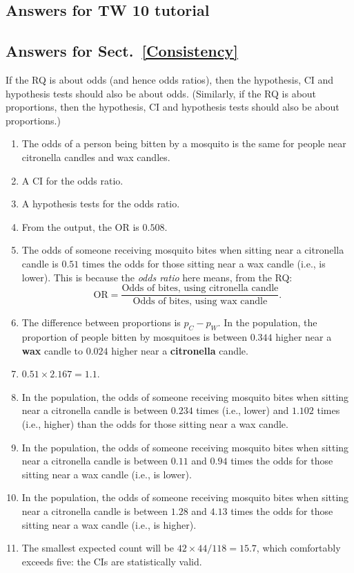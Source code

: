 \documentclass[
  11pt,
  a4paper,
  krantz2]{krantz}
\providecommand{\tightlist}{%
  \setlength{\itemsep}{0pt}\setlength{\parskip}{0pt}}
\begin{document}
\begin{footnotesize}
\section{Answers for TW 10 tutorial}\label{Lecture10Answers}

\subsection*{Answers for Sect.~\ref{Consistency}}\label{answers-for-sect.-refconsistency}

If the RQ is about odds (and hence odds ratios), then the hypothesis, CI and hypothesis tests should also be about odds.
(Similarly, if the RQ is about proportions, then the hypothesis, CI and hypothesis tests should also be about proportions.)

\begin{enumerate}
\def\labelenumi{\arabic{enumi}.}
\tightlist
\item
  The odds of a person being bitten by a mosquito is the same for people near citronella candles and wax candles.
\item
  A CI for the odds ratio.
\item
  A hypothesis tests for the odds ratio.
\item
  From the output, the OR is \(0.508\).
\item
  The odds of someone receiving mosquito bites when sitting near a citronella candle is \(0.51\) times the odds for those sitting near a wax candle (i.e., is lower).
  This is because the \emph{odds ratio} here means, from the RQ:
  \[
    \text{OR} = \frac{\text{Odds of bites, using citronella candle}}{\text{Odds of bites, using wax candle}}.
  \]
\item
  The difference between proportions is \(p_C - p_W\).
  In the population, the proportion of people bitten by mosquitoes is between \(0.344\) higher near a \textbf{wax} candle to \(0.024\) higher near a \textbf{citronella} candle.
\item
  \(0.51\times 2.167 = 1.1\).
\item
  In the population, the odds of someone receiving mosquito bites when sitting near a citronella candle is between \(0.234\) times (i.e., lower) and \(1.102\) times (i.e., higher) than the odds for those sitting near a wax candle.
\item
  In the population, the odds of someone receiving mosquito bites when sitting near a citronella candle is between \(0.11\) and \(0.94\) times the odds for those sitting near a wax candle (i.e., is lower).
\item
  In the population, the odds of someone receiving mosquito bites when sitting near a citronella candle is between \(1.28\) and \(4.13\) times the odds for those sitting near a wax candle (i.e., is higher).
\item
  The smallest expected count will be \(42\times 44/118 = 15.7\), which comfortably exceeds five: the CIs are statistically valid.
\end{enumerate}


\end{footnotesize}
\end{document}

